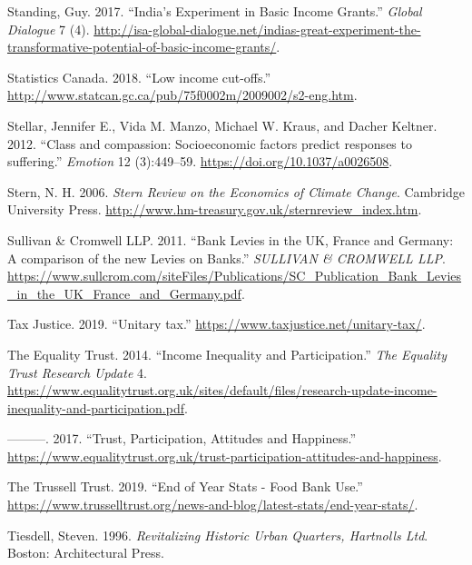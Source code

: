 \documentclass[]{tufte-handout}
\begin{document}
\leavevmode\hypertarget{ref-Standing2017}{}%
Standing, Guy. 2017. ``India's Experiment in Basic Income Grants.''
\emph{Global Dialogue} 7 (4).
\url{http://isa-global-dialogue.net/indias-great-experiment-the-transformative-potential-of-basic-income-grants/}.

\leavevmode\hypertarget{ref-StatisticsCanada2018}{}%
Statistics Canada. 2018. ``Low income cut-offs.''
\url{http://www.statcan.gc.ca/pub/75f0002m/2009002/s2-eng.htm}.

\leavevmode\hypertarget{ref-Stellar2012}{}%
Stellar, Jennifer E., Vida M. Manzo, Michael W. Kraus, and Dacher
Keltner. 2012. ``Class and compassion: Socioeconomic factors predict
responses to suffering.'' \emph{Emotion} 12 (3):449--59.
\url{https://doi.org/10.1037/a0026508}.

\leavevmode\hypertarget{ref-Stern2006a}{}%
Stern, N. H. 2006. \emph{Stern Review on the Economics of Climate
Change}. Cambridge University Press.
\url{http://www.hm-treasury.gov.uk/sternreview_index.htm}.

\leavevmode\hypertarget{ref-SullivanCromwellLLP2011}{}%
Sullivan \& Cromwell LLP. 2011. ``Bank Levies in the UK, France and
Germany: A comparison of the new Levies on Banks.'' \emph{SULLIVAN \&
CROMWELL LLP}.
\url{https://www.sullcrom.com/siteFiles/Publications/SC_Publication_Bank_Levies_in_the_UK_France_and_Germany.pdf}.

\leavevmode\hypertarget{ref-TaxJustice2019}{}%
Tax Justice. 2019. ``Unitary tax.''
\url{https://www.taxjustice.net/unitary-tax/}.

\leavevmode\hypertarget{ref-EqualityTrust2014}{}%
The Equality Trust. 2014. ``Income Inequality and Participation.''
\emph{The Equality Trust Research Update} 4.
\url{https://www.equalitytrust.org.uk/sites/default/files/research-update-income-inequality-and-participation.pdf}.

\leavevmode\hypertarget{ref-EqualityTrust2017}{}%
---------. 2017. ``Trust, Participation, Attitudes and Happiness.''
\url{https://www.equalitytrust.org.uk/trust-participation-attitudes-and-happiness}.

\leavevmode\hypertarget{ref-TheTrussellTrust2019}{}%
The Trussell Trust. 2019. ``End of Year Stats - Food Bank Use.''
\url{https://www.trusselltrust.org/news-and-blog/latest-stats/end-year-stats/}.

\leavevmode\hypertarget{ref-tiesdell1996}{}%
Tiesdell, Steven. 1996. \emph{Revitalizing Historic Urban Quarters,
Hartnolls Ltd}. Boston: Architectural Press.
\end{document}
